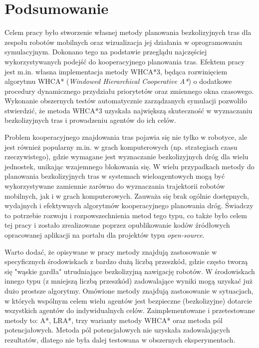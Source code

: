 \chapter{Podsumowanie}
\label{ch:podsumowanie}
Celem pracy było stworzenie własnej metody planowania bezkolizyjnych tras dla zespołu robotów mobilnych oraz wizualizacja jej działania w oprogramowaniu symulacyjnym.
Dokonano tego na podstawie przeglądu najczęściej wykorzystywanych podejść do kooperacyjnego planowania tras.
Efektem pracy jest m.in. własna implementacja metody WHCA*3, będąca rozwinięciem algorytmu WHCA* ({\it Windowed Hierarchical Cooperative A*}) o dodatkowe procedury dynamicznego przydziału priorytetów oraz zmiennego okna czasowego.
Wykonanie obszernych testów automatycznie zarządzanych symulacji pozwoliło stwierdzić, że metoda WHCA*3 uzyskała największą skuteczność w wyznaczaniu bezkolizyjnych tras i prowadzeniu agentów do ich celów.

Problem kooperacyjnego znajdowania tras pojawia się nie tylko w robotyce, ale jest również popularny m.in. w grach komputerowych (np. strategiach czasu rzeczywistego), gdzie wymagane jest wyznaczanie bezkolizyjnych dróg dla wielu jednostek, unikając wzajemnego blokowania się.
W wielu przypadkach metody do planowania bezkolizyjnych tras w systemach wieloagentowych mogą być wykorzystywane zamiennie zarówno do wyznaczania trajektorii robotów mobilnych, jak i w grach komputerowych.
Zauważa się brak ogólnie dostępnych, wydajnych i efektywnych algorytmów kooperacyjnego planowania dróg.
Świadczy to potrzebie rozwoju i rozpowszechnienia metod tego typu, co także było celem tej pracy i zostało zrealizowane poprzez opublikowanie kodów źródłowych opracowanej aplikacji na portalu dla projektów typu {\it open-source}.

Warto dodać, że opisywane w pracy metody znajdują zastosowanie w specyficznych środowiskach z bardzo dużą liczbą przeszkód, gdzie często tworzą się "wąskie gardła" utrudniające bezkolizyjną nawigację robotów.
W środowiskach innego typu (z mniejszą liczbą przeszkód) zadowalające wyniki mogą uzyskać już dużo prostsze algorytmy.
Omówione metody znajdują zastosowanie w sytuacjach, w których wspólnym celem wielu agentów jest bezpieczne (bezkolizyjne) dotarcie wszystkich agentów do indywidualnych celów.
Zaimplementowane i przetestowane metody to: A*, LRA*, trzy warianty metody WHCA* oraz metoda pól potencjałowych.
Metoda pól potencjałowych nie uzyskała zadowalających rezultatów, dlatego nie była dalej testowana w obszernych eksperymentach.

